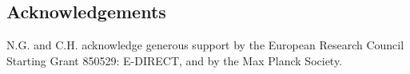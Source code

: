 \documentclass[9pt,twocolumn,twoside]{pnas-new}
\begin{document}
\subsection*{Acknowledgements}

N.G. and C.H. acknowledge generous support by the European Research Council
Starting Grant 850529: E-DIRECT, and by the Max Planck Society.


{\setlength{\bibsep}{0\baselineskip}
%

}


\clearpage
\newpage
\end{document}
